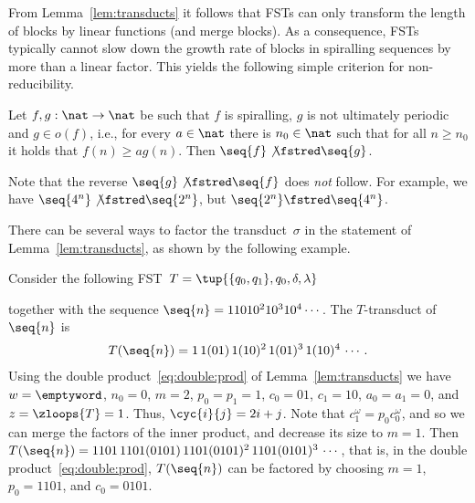 From Lemma~\ref{lem:transducts} it follows that FSTs can only transform 
the length of blocks by linear functions (and merge blocks).
As a consequence, FSTs typically cannot slow down the growth rate of blocks 
in spiralling sequences by more than a linear factor.
This yields the following simple criterion for non-reducibility. 
\begin{lemma}\label{lem:too:fast}
  Let $f,g : \nat \to \nat$ be
  such that $f$ is spiralling, $g$ is not ultimately periodic and $g \in o(f)$, 
  i.e., for every $a \in \nat$ there is $n_0 \in \nat$
  such that for all $n \ge n_0$ it holds that $f(n) \ge a g(n)$.
  Then $\seq{f} \not\fstred \seq{g}$. \end{lemma}
Note that the reverse $\seq{g} \not\fstred \seq{f}$ does \emph{not} follow.
For example, we have $\seq{4^n} \not\fstred \seq{2^n}$, but $\seq{2^n} \fstred \seq{4^n}$.

There can be several ways to factor the transduct~$\sigma$ 
in the statement of Lemma~\ref{lem:transducts},
as shown by the following example.

\begin{example}\label{ex:ambigue}
  Consider the following FST~$T = \tup{\{q_0,q_1\},q_0,\delta,\lambda}$
  \begin{center}
  \end{center}
  together with the sequence $\seq{n} = 1 10 10^2 10^3 10^4 \cdots$.
  The $T$-transduct of $\seq{n}$ is 
  \begin{align*}
    T(\seq{n}) = 1 \, 1 (01) \, 1 (10)^2 \, 1 (01)^3 \, 1 (10)^4 \, \cdots\,.
  \end{align*}
Using the double product~\eqref{eq:double:prod} of Lemma~\ref{lem:transducts} 
  we have $w = \emptyword$,
  $n_0 = 0$, $m = 2$, $p_0 = p_1 = 1$, $c_0 = 01$, $c_1 = 10$, $a_0 = a_1 = 0$, and $z = \zloops{T} = 1$.
  Thus, $\cyc{i}{j} = 2i + j$.  
Note that $c_1^\omega = p_0 c_0^\omega$, and so we can merge the factors of the inner product, and decrease its size to $m = 1$.
  Then $T(\seq{n}) = 1101 \, 1101 (0101) \, 1101 (0101)^2 \, 1101 (0101)^3 \, \cdots$, that is, 
  in the double product~\eqref{eq:double:prod}, $T(\seq{n})$ can be factored by choosing 
  $m = 1$, $p_0 = 1101$, and $c_0 = 0101$.
\end{example}

